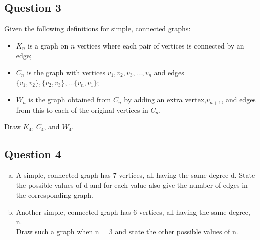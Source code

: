 \documentclass[]{article}
\begin{document}
\subsection*{Question 3}
Given the following definitions for simple, connected graphs:
\begin{itemize}
\item $K_n$ is a graph on $n$ vertices where each pair of vertices is connected by an edge;
\item $C_n$ is the graph with vertices $v_1, v_2, v_3, \dots, v_n$ and edges $\{v_1,v_2\}, \{v_2,v_3\}, \dots\{v_n, v_1\}$;
\item $W_n$ is the graph obtained from $C_n$ by adding an extra vertex,$v_{n+1}$, and edges
from this to each of the original vertices in $C_n$.
\end{itemize}
Draw $K_4$, $C_4$, and $W_4$. 



\subsection*{Question 4}
\begin{enumerate}[(a)]
\item A simple, connected graph has 7 vertices, all having the same degree d.
State the possible values of d and for each value also give the number of edges
in the corresponding graph.
\item  Another simple, connected graph has 6 vertices, all having the same degree, n.\\ Draw such a graph when n = 3 and state the other possible values of n.
\end{enumerate}
\end{document}
